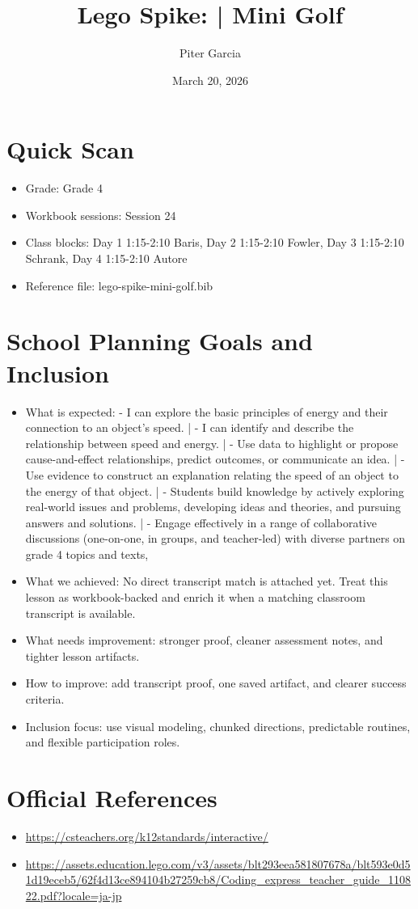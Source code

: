 \documentclass[11pt]{article}
\title{Lego Spike: | Mini Golf}
\author{Piter Garcia}
\date{March 20, 2026}
\begin{document}
    \maketitle
    \section*{Quick Scan}
    \begin{itemize}[leftmargin=*]
    \item Grade: Grade 4
    \item Workbook sessions: Session 24
    \item Class blocks: Day 1 1:15-2:10 Baris, Day 2 1:15-2:10 Fowler, Day 3 1:15-2:10 Schrank, Day 4 1:15-2:10 Autore
    \item Reference file: lego-spike-mini-golf.bib
    \end{itemize}
    \section*{School Planning Goals and Inclusion}
    \begin{itemize}[leftmargin=*]
    \item What is expected: - I can explore the basic principles of energy and their connection to an object's speed. | - I can identify and describe the relationship between speed and energy. | - Use data to highlight or propose cause-and-effect relationships, predict outcomes, or communicate an idea. | - Use evidence to construct an explanation relating the speed of an object to the energy of that object. | - Students build knowledge by actively exploring real-world issues and problems, developing ideas and theories, and pursuing answers and solutions. | - Engage effectively in a range of collaborative discussions (one-on-one, in groups, and teacher-led) with diverse partners on grade 4 topics and texts,
    \item What we achieved: No direct transcript match is attached yet. Treat this lesson as workbook-backed and enrich it when a matching classroom transcript is available.
    \item What needs improvement: stronger proof, cleaner assessment notes, and tighter lesson artifacts.
    \item How to improve: add transcript proof, one saved artifact, and clearer success criteria.
    \item Inclusion focus: use visual modeling, chunked directions, predictable routines, and flexible participation roles.
    \end{itemize}
    \section*{Official References}
    \begin{itemize}[leftmargin=*]
    \item \url{https://csteachers.org/k12standards/interactive/}
\item \url{https://assets.education.lego.com/v3/assets/blt293eea581807678a/blt593e0d51d19eceb5/62f4d13ce894104b27259cb8/Coding_express_teacher_guide_110822.pdf?locale=ja-jp}

    \end{itemize}
    
\end{document}
